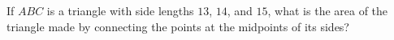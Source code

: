 If $ABC$ is a triangle with side lengths $13$, $14$, and $15$, what is the area of the triangle made by connecting the points at the midpoints of its sides?
